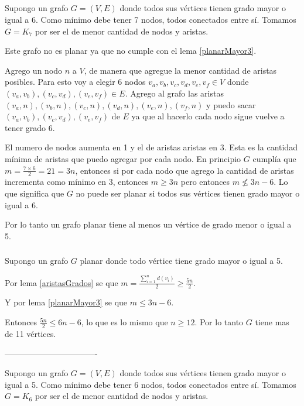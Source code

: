 \subsection{}

\subsubsection{}
Supongo un grafo $G = (V, E)$ donde todos sus vértices tienen grado mayor o igual a 6. Como mínimo debe tener 7 nodos, todos conectados entre sí. Tomamos $G = K_7$ por ser el de menor cantidad de nodos y aristas.

Este grafo no es planar ya que no cumple con el lema \ref{planarMayor3}.

Agrego un nodo $n$ a $V$, de manera que agregue la menor cantidad de aristas posibles. Para esto voy a elegir 6 nodos $v_a, v_b, v_c, v_d, v_e, v_f \in V$ donde $(v_a, v_b), (v_c, v_d), (v_e, v_f) \in E$. Agrego al grafo las aristas $(v_a, n), (v_b, n), (v_c, n), (v_d, n), (v_e, n), (v_f, n)$ y puedo sacar $(v_a, v_b), (v_c, v_d), (v_e, v_f)$ de $E$ ya que al hacerlo cada nodo sigue vuelve a tener grado 6.

El numero de nodos aumenta en 1 y el de aristas aristas en 3. Esta es la cantidad mínima de aristas que puedo agregar por cada nodo. En principio $G$ cumplía que $m = \frac{7 \times 6}{2} = 21 = 3n$, entonces si por cada nodo que agrego la cantidad de aristas incrementa como mínimo en 3, entonces $m \geq 3n$ pero entonces $m \not \leq 3n - 6$. Lo que significa que $G$ no puede ser planar si todos sus vértices tienen grado mayor o igual a 6.

Por lo tanto un grafo planar tiene al menos un vértice de grado menor o igual a 5.

\subsubsection{}
Supongo un grafo $G$ planar donde todo vértice tiene grado mayor o igual a 5.

Por lema \ref{aristasGrados} se que $m = \frac{\sum_{i = 1}^{n}d(v_i)}{2} \geq \frac{5n}{2}$.

Y por lema \ref{planarMayor3} se que $m \leq 3n - 6$.

Entonces $\frac{5n}{2} \leq 6n - 6$, lo que es lo mismo que $n \geq 12$. Por lo tanto $G$ tiene mas de 11 vértices.

----------------------------------

Supongo un grafo $G = (V, E)$ donde todos sus vértices tienen grado mayor o igual a 5. Como mínimo debe tener 6 nodos, todos conectados entre sí. Tomamos $G = K_6$ por ser el de menor cantidad de nodos y aristas.

